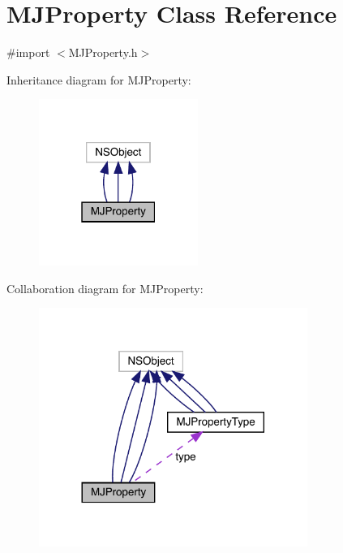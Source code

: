 \hypertarget{interface_m_j_property}{}\section{M\+J\+Property Class Reference}
\label{interface_m_j_property}


{\ttfamily \#import $<$M\+J\+Property.\+h$>$}



Inheritance diagram for M\+J\+Property\+:\nopagebreak
\begin{figure}[H]
\begin{center}
\leavevmode
\includegraphics[width=147pt]{interface_m_j_property__inherit__graph}
\end{center}
\end{figure}


Collaboration diagram for M\+J\+Property\+:\nopagebreak
\begin{figure}[H]
\begin{center}
\leavevmode
\includegraphics[width=248pt]{interface_m_j_property__coll__graph}
\end{center}
\end{figure}
